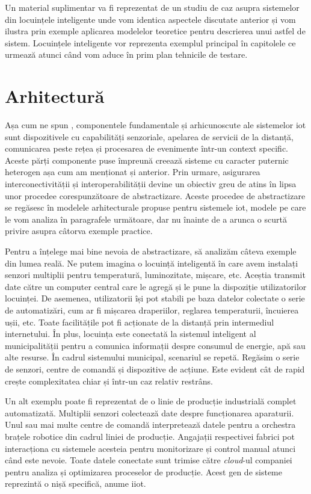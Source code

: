 Un material suplimentar va fi reprezentat de un studiu de caz asupra sistemelor din locuințele inteligente unde vom identica aspectele discutate anterior și vom ilustra prin exemple aplicarea modelelor teoretice pentru descrierea unui astfel de sistem. Locuințele inteligente vor reprezenta exemplul principal în capitolele ce urmează atunci când vom aduce în prim plan tehnicile de testare.

\section{Arhitectură}

Așa cum ne spun \cite{Khodadadi2016}, componentele fundamentale și arhicunoscute ale sistemelor \acrshort{iot} sunt dispozitivele cu capabilități senzoriale, apelarea de servicii de la distanță, comunicarea peste rețea și procesarea de evenimente într-un context specific. Aceste părți componente puse împreună creează sisteme cu caracter puternic heterogen așa cum am menționat și anterior. Prin urmare, asigurarea interconectivității și interoperabilității devine un obiectiv greu de atins în lipsa unor procedee corespunzătoare de abstractizare. Aceste procedee de abstractizare se regăsesc în modelele arhitecturale propuse pentru sistemele \acrshort{iot}, modele pe care le vom analiza în paragrafele următoare, dar nu înainte de a arunca o scurtă privire asupra câtorva exemple practice.

Pentru a înțelege mai bine nevoia de abstractizare, să analizăm câteva exemple din lumea reală. Ne putem imagina o locuință inteligentă în care avem instalați senzori multiplii pentru temperatură, luminozitate, mișcare, etc. Aceștia transmit date către un computer central care le agregă și le pune la dispoziție utilizatorilor locuinței. De asemenea, utilizatorii își pot stabili pe baza datelor colectate o serie de automatizări, cum ar fi mișcarea draperiilor, reglarea temperaturii, încuierea ușii, etc. Toate facilitățile pot fi acționate de la distanță prin intermediul internetului. În plus, locuința este conectată la sistemul inteligent al municipalității pentru a comunica informații despre consumul de energie, apă sau alte resurse. În cadrul sistemului municipal, scenariul se repetă. Regăsim o serie de senzori, centre de comandă și dispozitive de acțiune. Este evident cât de rapid crește complexitatea chiar și într-un caz relativ restrâns.

Un alt exemplu poate fi reprezentat de o linie de producție industrială complet automatizată. Multiplii senzori colectează date despre funcționarea aparaturii. Unul sau mai multe centre de comandă interpretează datele pentru a orchestra brațele robotice din cadrul liniei de producție. Angajații respectivei fabrici pot interacționa cu sistemele acesteia pentru monitorizare și control manual atunci când este nevoie. Toate datele conectate sunt trimise către \textit{cloud}-ul companiei pentru analiza și optimizarea proceselor de producție. Acest gen de sisteme reprezintă o nișă specifică, anume \acrfull{iiot}. 

